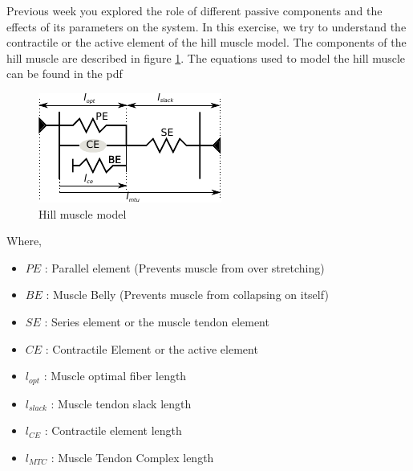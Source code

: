\documentclass{cmc}
\begin{document}
Previous week you explored the role of different passive components
and the effects of its parameters on the system. In this exercise, we
try to understand the contractile or the active element of the hill
muscle model. The components of the hill muscle are described in
figure \ref{fig:hill_muscle}. The equations used to model the hill
muscle can be found in the pdf 

\begin{figure}[H]
  \centering \includegraphics[scale=2.5]{figures/hill_muscle}
  \caption{Hill muscle model}
  \label{fig:hill_muscle}
\end{figure}

Where,

\begin{itemize}
\item $PE$ : Parallel element (Prevents muscle from over stretching)
\item $BE$ : Muscle Belly (Prevents muscle from collapsing on itself)
\item $SE$ : Series element or the muscle tendon element
\item $CE$ : Contractile Element or the active element
\item $l_{opt}$ : Muscle optimal fiber length
\item $l_{slack}$ : Muscle tendon slack length
\item $l_{CE}$ : Contractile element length
\item $l_{MTC}$ : Muscle Tendon Complex length
\end{itemize}
\end{document}
